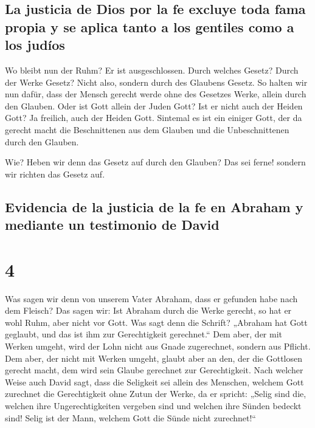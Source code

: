 \hypertarget{la-justicia-de-dios-por-la-fe-excluye-toda-fama-propia-y-se-aplica-tanto-a-los-gentiles-como-a-los-juduxedos}{%
\subsection{La justicia de Dios por la fe excluye toda fama propia y se
aplica tanto a los gentiles como a los
judíos}\label{la-justicia-de-dios-por-la-fe-excluye-toda-fama-propia-y-se-aplica-tanto-a-los-gentiles-como-a-los-juduxedos}}

 Wo bleibt nun der Ruhm? Er ist ausgeschlossen. Durch
welches Gesetz? Durch der Werke Gesetz? Nicht also, sondern durch des
Glaubens Gesetz.  So halten wir nun dafür, dass der
Mensch gerecht werde ohne des Gesetzes Werke, allein durch den Glauben.
 Oder ist Gott allein der Juden Gott? Ist er nicht auch
der Heiden Gott? Ja freilich, auch der Heiden Gott. 
Sintemal es ist ein einiger Gott, der da gerecht macht die Beschnittenen
aus dem Glauben und die Unbeschnittenen durch den Glauben.

 Wie? Heben wir denn das Gesetz auf durch den Glauben?
Das sei ferne! sondern wir richten das Gesetz auf.

\hypertarget{evidencia-de-la-justicia-de-la-fe-en-abraham-y-mediante-un-testimonio-de-david}{%
\subsection{Evidencia de la justicia de la fe en Abraham y mediante un
testimonio de
David}\label{evidencia-de-la-justicia-de-la-fe-en-abraham-y-mediante-un-testimonio-de-david}}

\hypertarget{section-3}{%
\section{4}\label{section-3}}

 Was sagen wir denn von unserem Vater Abraham, dass er
gefunden habe nach dem Fleisch?  Das sagen wir: Ist
Abraham durch die Werke gerecht, so hat er wohl Ruhm, aber nicht vor
Gott.  Was sagt denn die Schrift? „Abraham hat Gott
geglaubt, und das ist ihm zur Gerechtigkeit gerechnet.`` 
Dem aber, der mit Werken umgeht, wird der Lohn nicht aus Gnade
zugerechnet, sondern aus Pflicht.  Dem aber, der nicht mit
Werken umgeht, glaubt aber an den, der die Gottlosen gerecht macht, dem
wird sein Glaube gerechnet zur Gerechtigkeit.  Nach
welcher Weise auch David sagt, dass die Seligkeit sei allein des
Menschen, welchem Gott zurechnet die Gerechtigkeit ohne Zutun der Werke,
da er spricht:  „Selig sind die, welchen ihre
Ungerechtigkeiten vergeben sind und welchen ihre Sünden bedeckt sind!
 Selig ist der Mann, welchem Gott die Sünde nicht
zurechnet!{}``

